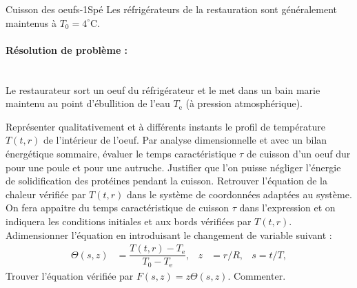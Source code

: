 \begin{exercise}{Cuisson des oeufs}{-1}{Spé}
Les réfrigérateurs de la restauration sont généralement maintenus à $T_\text{0} = 4^\circ$C.

\paragraph{Résolution de problème :}~\\
Le restaurateur sort un oeuf du réfrigérateur et le met dans un bain marie maintenu au point d'ébullition de l'eau $T_\text{e}$ (à pression atmosphérique).

\begin{questions}
    \question Représenter qualitativement et à différents instants le profil de température $T(t,r)$ de l'intérieur de l'oeuf.
    \question Par analyse dimensionnelle et avec un bilan énergétique sommaire, évaluer le temps caractéristique $\tau$ de cuisson d'un oeuf dur pour une poule et pour une autruche.
    \question Justifier que l'on puisse négliger l'énergie de solidification des protéines pendant la cuisson.
    \question Retrouver l'équation de la chaleur vérifiée par $T(t,r)$ dans le système de coordonnées adaptées au système. On fera appaitre du temps caractéristique de cuisson $\tau$ dans l'expression et on indiquera les conditions initiales et aux bords vérifiées par $T(t,r)$.
    \question Adimensionner l'équation en introduisant le changement de variable suivant :
        \begin{align*}
            \Theta(s,z) &= \dfrac{T(t,r) - T_\text{e}}{T_\text{0} - T_\text{e}}, &
            z &= r/R, & s = t/T,
        \end{align*}
    \question Trouver l'équation vérifiée par $F(s,z) = z\Theta(s,z)$. Commenter.
    
\end{questions}

\end{exercise}
